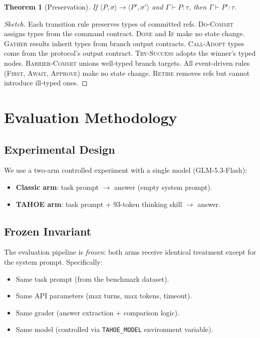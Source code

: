 \documentclass[11pt,a4paper]{article}
\newtheorem{theorem}{Theorem}
\begin{document}
\begin{theorem}[Preservation]
If $\langle P, \sigma \rangle \to \langle P', \sigma' \rangle$ and $\Gamma \vdash P : \tau$, then $\Gamma \vdash P' : \tau$.
\end{theorem}

\begin{proof}[Sketch]
Each transition rule preserves types of committed refs.
\textsc{Do-Commit} assigns types from the command contract.
\textsc{Done} and \textsc{If} make no state change.
\textsc{Gather} results inherit types from branch output contracts.
\textsc{Call-Adopt} types come from the protocol's output contract.
\textsc{Try-Success} adopts the winner's typed nodes.
\textsc{Barrier-Commit} unions well-typed branch targets.
All event-driven rules (\textsc{First}, \textsc{Await}, \textsc{Approve}) make no state change.
\textsc{Retire} removes refs but cannot introduce ill-typed ones.
\end{proof}

\section{Evaluation Methodology}
\label{sec:methodology}

\subsection{Experimental Design}

We use a two-arm controlled experiment with a single model (GLM-5.3-Flash):

\begin{itemize}[nosep,leftmargin=*]
    \item \textbf{Classic arm}: task prompt $\to$ answer (empty system prompt).
    \item \textbf{TAHOE arm}: task prompt + 93-token thinking skill $\to$ answer.
\end{itemize}

\subsection{Frozen Invariant}
\label{subsec:frozen}

The evaluation pipeline is \emph{frozen}: both arms receive identical treatment except for the system prompt.
Specifically:

\begin{itemize}[nosep,leftmargin=*]
    \item Same task prompt (from the benchmark dataset).
    \item Same API parameters (max turns, max tokens, timeout).
    \item Same grader (answer extraction + comparison logic).
    \item Same model (controlled via \texttt{TAHOE\_MODEL} environment variable).
\end{itemize}
\end{document}
